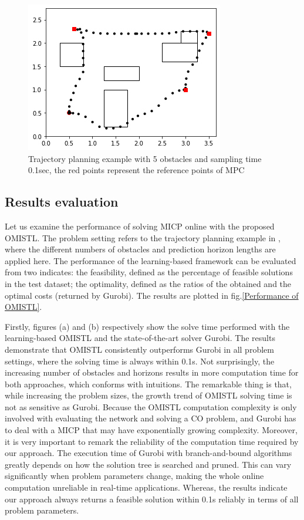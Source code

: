 \documentclass[a4paper]{report}
\begin{document}
 \begin{figure}
    \centering
    \includegraphics[scale=0.6]{mpc_route.png}
    \vspace{-0.4cm}
    \caption{
    Trajectory planning example with 5 obstacles and sampling time 0.1sec, the red points represent the reference points of MPC}
    \label{mpc_route}
    \end{figure}

 \subsection{Results evaluation}
Let us examine the performance of solving MICP online with the proposed OMISTL. The problem setting refers to the trajectory planning example in \cite[]{bertsimas2022online}, where the different numbers of obstacles and prediction horizon lengths are applied here. The performance of the learning-based framework can be evaluated from two indicates: the feasibility, defined as the percentage of feasible solutions in the test dataset; the optimality, defined as the ratios of the obtained and the optimal costs (returned by Gurobi). The results are plotted in fig.\ref*{Performance of OMISTL}. 

Firstly, figures (a) and (b) respectively show the solve time performed with the learning-based OMISTL and the state-of-the-art solver Gurobi. The results demonstrate that OMISTL consistently outperforms Gurobi in all problem settings, where the solving time is always within 0.1s. Not surprisingly, the increasing number of obstacles and horizons results in more computation time for both approaches, which conforms with intuitions. The remarkable thing is that, while increasing the problem sizes, the growth trend of OMISTL solving time is not as sensitive as Gurobi. Because the OMISTL computation complexity is only involved with evaluating the network and solving a CO problem, and Gurobi has to deal with a MICP that may have exponentially growing complexity. Moreover, it is very important to remark the reliability of the computation time required by our approach. The execution time of Gurobi with branch-and-bound algorithms greatly depends on how the solution tree is searched and pruned. This can vary significantly when problem parameters change, making the whole online computation unreliable in real-time applications. Whereas, the results indicate our approach always returns a feasible solution within 0.1s reliably in terms of all problem parameters.
\end{document}
